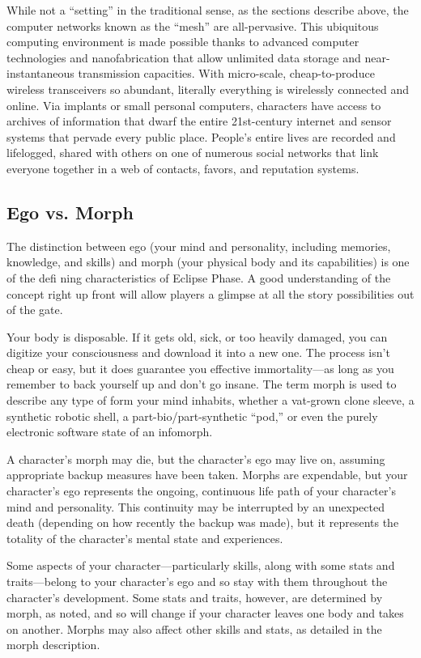 While not a ``setting'' in the traditional sense, as the sections describe above, the computer networks known as the ``mesh'' are all-pervasive. This ubiquitous computing environment is made possible thanks to advanced computer technologies and nanofabrication that allow unlimited data storage and near-instantaneous transmission capacities. With micro-scale, cheap-to-produce wireless transceivers so abundant, literally everything is wirelessly connected and online. Via implants or small personal computers, characters have access to archives of information that dwarf the entire 21st-century internet and sensor systems that pervade every public place. People's entire lives are recorded and lifelogged, shared with others on one of numerous social networks that link everyone together in a web of contacts, favors, and reputation systems.


\subsection{Ego vs. Morph}
\label{sec:ego-vs.-morph}

The distinction between ego (your mind and personality, including memories, knowledge, and skills) and morph (your physical body and its capabilities) is one of the defi ning characteristics of Eclipse Phase. A good understanding of the concept right up front will allow players a glimpse at all the story possibilities out of the gate.

Your body is disposable. If it gets old, sick, or too heavily damaged, you can digitize your consciousness and download it into a new one. The process isn't cheap or easy, but it does guarantee you effective immortality—as long as you remember to back yourself up and don't go insane. The term morph is used to describe any type of form your mind inhabits, whether a vat-grown clone sleeve, a synthetic robotic shell, a part-bio/part-synthetic ``pod,'' or even the purely electronic software state of an infomorph.

A character's morph may die, but the character's ego may live on, assuming appropriate backup measures have been taken. Morphs are expendable, but your character's ego represents the ongoing, continuous life path of your character's mind and personality. This continuity may be interrupted by an unexpected death (depending on how recently the backup was made), but it represents the totality of the character's mental state and experiences.

Some aspects of your character—particularly skills, along with some stats and traits—belong to your character's ego and so stay with them throughout the character's development. Some stats and traits, however, are determined by morph, as noted, and so will change if your character leaves one body and takes on another. Morphs may also affect other skills and stats, as detailed in the morph description.


